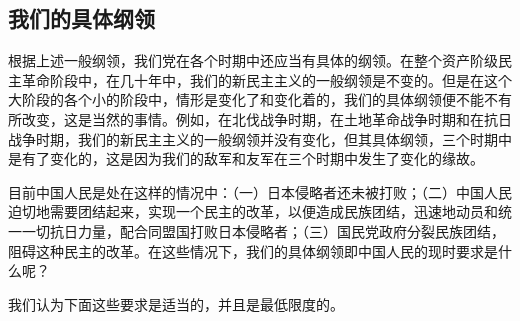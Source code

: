 \subsection{我们的具体纲领}

根据上述一般纲领，我们党在各个时期中还应当有具体的纲领。在整个资产阶级民主革命阶段中，在几十年中，我们的新民主主义的一般纲领是不变的。但是在这个大阶段的各个小的阶段中，情形是变化了和变化着的，我们的具体纲领便不能不有所改变，这是当然的事情。例如，在北伐战争时期，在土地革命战争时期和在抗日战争时期，我们的新民主主义的一般纲领并没有变化，但其具体纲领，三个时期中是有了变化的，这是因为我们的敌军和友军在三个时期中发生了变化的缘故。

目前中国人民是处在这样的情况中：（一）日本侵略者还未被打败；（二）中国人民迫切地需要团结起来，实现一个民主的改革，以便造成民族团结，迅速地动员和统一一切抗日力量，配合同盟国打败日本侵略者；（三）国民党政府分裂民族团结，阻碍这种民主的改革。在这些情况下，我们的具体纲领即中国人民的现时要求是什么呢？

我们认为下面这些要求是适当的，并且是最低限度的。

